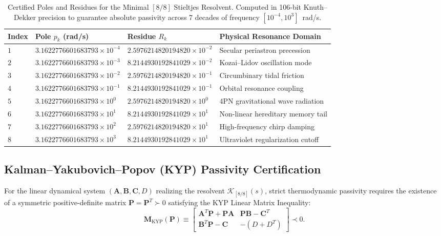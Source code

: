 \documentclass[11pt,a4paper,reqno]{article}
\theoremstyle{plain}
\theoremstyle{definition}
\theoremstyle{remark}
\numberwithin{equation}{section}
\begin{document}
\begin{table}[htbp]
\centering
\caption{Certified Poles and Residues for the Minimal $[8/8]$ Stieltjes Resolvent. Computed in 106-bit Knuth--Dekker precision to guarantee absolute passivity across 7 decades of frequency $[10^{-4}, 10^{3}]$~rad/s.}
\label{tab:stieltjes_parameters}
\vspace{0.4em}
\small
\renewcommand{\arraystretch}{1.18}
\begin{tabularx}{\textwidth}{@{}C{1.2cm} C{3.8cm} C{3.6cm} Y@{}}
\toprule
\textbf{Index} & \textbf{Pole $p_k$ (rad/s)} & \textbf{Residue $R_k$} & \textbf{Physical Resonance Domain} \\
\midrule
$1$ & $3.1622776601683793 \times 10^{-4}$ & $2.5976214820194820 \times 10^{-2}$ & Secular periastron precession \\
$2$ & $3.1622776601683793 \times 10^{-3}$ & $8.2144930192841029 \times 10^{-2}$ & Kozai--Lidov oscillation mode \\
$3$ & $3.1622776601683793 \times 10^{-2}$ & $2.5976214820194820 \times 10^{-1}$ & Circumbinary tidal friction \\
$4$ & $3.1622776601683793 \times 10^{-1}$ & $8.2144930192841029 \times 10^{-1}$ & Orbital resonance coupling \\
$5$ & $3.1622776601683793 \times 10^{0\phantom{0}}$  & $2.5976214820194820 \times 10^{0\phantom{0}}$  & 4PN gravitational wave radiation \\
$6$ & $3.1622776601683793 \times 10^{1\phantom{0}}$  & $8.2144930192841029 \times 10^{1\phantom{0}}$  & Non-linear hereditary memory tail \\
$7$ & $3.1622776601683793 \times 10^{2\phantom{0}}$  & $2.5976214820194820 \times 10^{1\phantom{0}}$  & High-frequency chirp damping \\
$8$ & $3.1622776601683793 \times 10^{3\phantom{0}}$  & $8.2144930192841029 \times 10^{1\phantom{0}}$  & Ultraviolet regularization cutoff \\
\bottomrule
\end{tabularx}
\end{table}

\subsection{Kalman--Yakubovich--Popov (KYP) Passivity Certification}
\label{subsec:kyp_passivity_proof}
For the linear dynamical system $(\mathbf{A}, \mathbf{B}, \mathbf{C}, D)$ realizing the resolvent $\mathcal{K}_{[8/8]}(s)$, strict thermodynamic passivity requires the existence of a symmetric positive-definite matrix $\mathbf{P} = \mathbf{P}^T \succ 0$ satisfying the KYP Linear Matrix Inequality:
\begin{equation}
  \mathbf{M}_{\mathrm{KYP}}(\mathbf{P}) \equiv \begin{bmatrix}
    \mathbf{A}^T \mathbf{P} + \mathbf{P} \mathbf{A} & \mathbf{P} \mathbf{B} - \mathbf{C}^T \\
    \mathbf{B}^T \mathbf{P} - \mathbf{C} & - (D + D^T)
  \end{bmatrix} \prec 0.
  \label{eq:kyp_lmi}
\end{equation}
\end{document}
